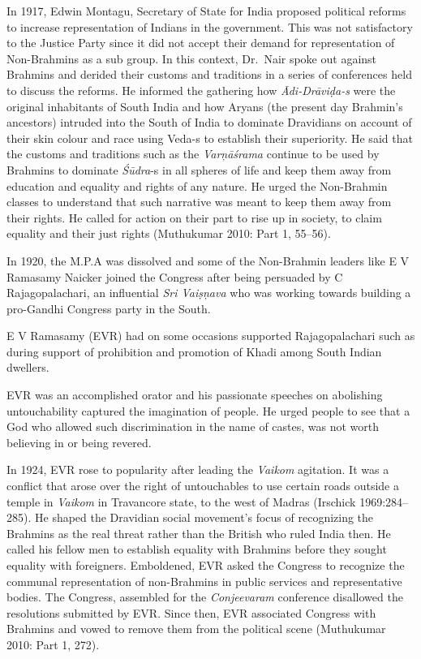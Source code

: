 In 1917, Edwin Montagu, Secretary of State for India proposed political reforms to increase representation of Indians in the government. This was not satisfactory to the Justice Party since it did not accept their demand for representation of Non-Brahmins as a sub group. In this context, Dr.\ Nair spoke out against Brahmins and derided their customs and traditions in a series of conferences held to discuss the reforms. He informed the gathering how \textit{Ādi-Drāviḍa-s} were the original inhabitants of South India and how Aryans (the present day Brahmin’s ancestors) intruded into the South of India to dominate Dravidians on account of their skin colour and race using Veda-s to establish their superiority. He said that the customs and traditions such as the \textit{Varņāśrama} continue to be used by Brahmins to dominate \textit{Śūdra}-s in all spheres of life and keep them away from education and equality and rights of any nature. He urged the Non-Brahmin classes to understand that such narrative was meant to keep them away from their rights. He called for action on their part to rise up in society, to claim equality and their just rights (Muthukumar 2010: Part 1, 55–56).

In 1920, the M.P.A was dissolved and some of the Non-Brahmin leaders like E V Ramasamy Naicker joined the Congress after being persuaded by C Rajagopalachari, an influential \textit{Sri Vaiṣņava }who was working towards building a pro-Gandhi Congress party in the South.

E V Ramasamy (EVR) had on some occasions supported Rajagopalachari such as during support of prohibition and promotion of Khadi among South Indian dwellers.

EVR was an accomplished orator and his passionate speeches on abolishing untouchability captured the imagination of people. He urged people to see that a God who allowed such discrimination in the name of castes, was not worth believing in or being revered.

\newpage

In 1924, EVR rose to popularity after leading the \textit{Vaikom} agitation. It was a conflict that arose over the right of untouchables to use certain roads outside a temple in \textit{Vaikom} in Travancore state, to the west of Madras (Irschick 1969:284–285). He shaped the Dravidian social movement’s focus of recognizing the Brahmins as the real threat rather than the British who ruled India then. He called his fellow men to establish equality with Brahmins before they sought equality with foreigners. Emboldened, EVR asked the Congress to recognize the communal representation of non-Brahmins in public services and representative bodies. The Congress, assembled for the \textit{Conjeevaram} conference disallowed the resolutions submitted by EVR. Since then, EVR associated Congress with Brahmins and vowed to remove them from the political scene (Muthukumar 2010: Part 1, 272).


